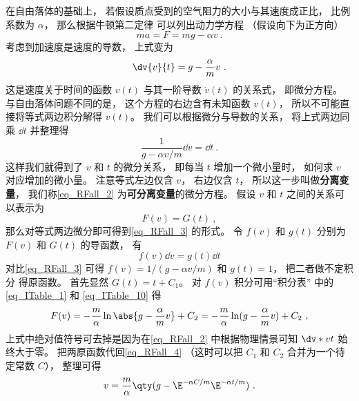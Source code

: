 

在自由落体的基础上， 若假设质点受到的空气阻力的大小与其速度成正比， 比例系数为 $\alpha$， 那么根据牛顿第二定律 可以列出动力学方程 （假设向下为正方向）
\begin{equation}
ma = F = mg - \alpha v~.
\end{equation}
考虑到加速度是速度的导数， 上式变为
\begin{equation}\label{eq_RFall_2}
\dv{v}{t} = g - \frac{\alpha}{m} v~.
\end{equation}
这是速度关于时间的函数 $v(t)$ 与其一阶导数 $\dot v(t)$ 的关系式， 即微分方程。 与自由落体问题不同的是， 这个方程的右边含有未知函数 $v(t)$， 所以不可能直接将等式两边积分解得 $v(t)$。 我们可以根据微分与导数的关系， 将上式两边同乘 $\dd{t}$ 并整理得
\begin{equation}\label{eq_RFall_3}
\frac{1}{g - \alpha v/m} \dd{v} = \dd{t}~.
\end{equation}
这样我们就得到了 $v$ 和 $t$ 的微分关系， 即每当 $t$ 增加一个微小量时， 如何求 $v$ 对应增加的微小量。 注意等式左边仅含 $v$， 右边仅含 $t$， 所以这一步叫做\textbf{分离变量}， 我们称\autoref{eq_RFall_2} 为\textbf{可分离变量}的微分方程。 假设 $v$ 和 $t$ 之间的关系可以表示为
\begin{equation}\label{eq_RFall_4}
F(v) = G(t)~,
\end{equation}
那么对等式两边微分即可得到\autoref{eq_RFall_3} 的形式。 令 $f(v)$ 和 $g(t)$ 分别为 $F(v)$ 和 $G(t)$ 的导函数， 有
\begin{equation}\label{eq_RFall_5}
f(v) \dd{v} = g(t) \dd{t}
\end{equation}
对比\autoref{eq_RFall_3} 可得 $f(v) = 1/(g - \alpha v/m)$ 和 $g(t) = 1$， 把二者做不定积分 得原函数。 首先显然 $G(t) = t + C_1$。 对 $f(v)$ 积分可用“积分表” 中的\autoref{eq_ITable_1} 和 \autoref{eq_ITable_10} 得
\begin{equation}
F(v) = -\frac{m}{\alpha} \ln\abs{g - \frac{\alpha}{m} v} + C_2 = -\frac{m}{\alpha} \ln(g - \frac{\alpha}{m} v) + C_2~,
\end{equation}
 上式中绝对值符号可去掉是因为在\autoref{eq_RFall_2} 中根据物理情景可知 $\dv*{v}{t}$ 始终大于零。 把两原函数代回\autoref{eq_RFall_4} （这时可以把 $C_1$ 和 $C_2$ 合并为一个待定常数 $C$）， 整理可得
\begin{equation}
v = \frac{m}{\alpha} \qty( g - \E^{-\alpha C/m} \E^{-\alpha t/m} )~.
\end{equation}
